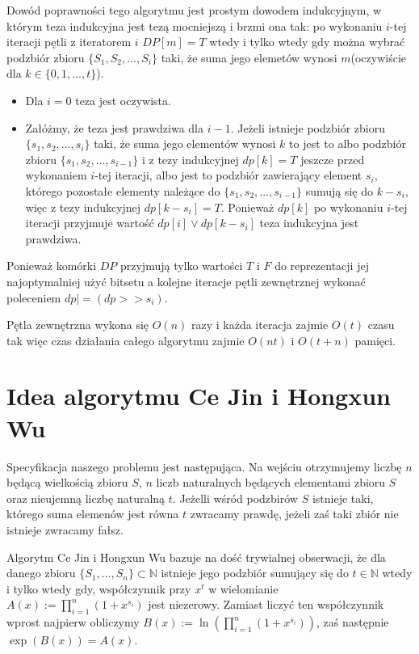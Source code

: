 \documentclass{article}
\begin{document}
Dowód poprawności tego algorytmu jest prostym dowodem indukcyjnym, w którym teza indukcyjna
jest tezą mocniejszą i brzmi ona tak: po wykonaniu $i$-tej iteracji pętli z iteratorem $i$ $DP[m]=T$ 
wtedy i tylko wtedy
gdy można wybrać podzbiór zbioru $\{S_1,S_2,...,S_i\}$ taki, że suma jego elemetów wynosi 
$m$(oczywiście dla $k \in \{0,1,...,t\}$). 
\begin{itemize}
    \item Dla $i = 0$ teza jest oczywista.
    \item Załóżmy, że teza jest prawdziwa dla $i-1$. Jeżeli istnieje podzbiór
    zbioru $\{s_1,s_2,...,s_i\}$ taki, że suma jego elementów wynosi $k$ to jest to 
    albo podzbiór zbioru $\{s_1,s_2,...,s_{i-1}\}$ i z tezy indukcyjnej $dp[k]=T$
    jeszcze przed wykonaniem $i$-tej iteracji, albo jest to podzbiór zawierający element
    $s_i$, którego pozostałe elementy należące do $\{s_1,s_2,...,s_{i-1}\}$ sumują się 
    do $k-s_i$, więc z tezy indukcyjnej $dp[k-s_i] = T$. Ponieważ $dp[k]$ po wykonaniu $i$-tej iteracji
    przyjmuje wartość $dp[i] \lor dp[k-s_i] $ teza indukcyjna jest prawdziwa.
  \end{itemize}
Ponieważ komórki $DP$ przyjmują tylko wartości $T$ i $F$ do reprezentacji jej najoptymalniej
użyć bitsetu a kolejne iteracje pętli zewnętrznej wykonać poleceniem $dp |= (dp >> s_i)$.

Pętla zewnętrzna wykona się $O(n)$ razy i każda iteracja zajmie $O(t)$ czasu tak więc czas działania całego algorytmu zajmie $O(nt)$ i $O(t+n)$ pamięci.
\section{Idea algorytmu Ce Jin i Hongxun Wu}

Specyfikacja naszego problemu jest następująca. Na wejściu otrzymujemy liczbę $n$ będącą wielkością
zbioru $S$, $n$ liczb naturalnych będących elementami zbioru $S$ oraz nieujemną liczbę naturalną
$t$. Jeżelli wśród podzbirów $S$ istnieje taki, którego suma elemenów jest równa $t$ zwracamy 
prawdę, jeżeli zaś taki zbiór nie istnieje zwracamy fałsz.

Algorytm Ce Jin i Hongxun Wu bazuje na dość trywialnej obserwacji, że dla danego zbioru
$\{S_1,...,S_n\} \subset \mathbb{N}$ istnieje jego podzbiór sumujący się do $t \in \mathbb{N}$ wtedy 
i tylko wtedy gdy, współczynnik przy $x^t$ w  wielomianie $A(x) :=\prod_{i = 1}^{n}(1+x^{s_i})$ jest 
niezerowy. Zamiast liczyć ten współczynnik wprost najpierw obliczymy $B(x):=\ln(\prod_{i = 1}^{n}(1+x^{s_i}))$, 
zaś następnie $\exp(B(x)) = A(x)$. 
\end{document}
